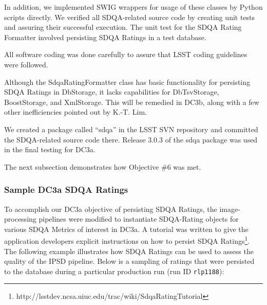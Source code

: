 \noindent
In addition, we implemented SWIG wrappers for usage of these classes by Python scripts
directly.  We verified all SDQA-related source code by creating unit tests and assuring
their successful execution.  The unit test for the SDQA Rating Formatter involved 
persisting SDQA Ratings in a test database.  

All software coding was done carefully to assure that LSST coding guidelines were followed.

Although the SdqaRatingFormatter class has basic functionality for persisting SDQA Ratings
in DbStorage, it lacks capabilities for DbTsvStorage, BoostStorage, and XmlStorage.  This
will be remedied in DC3b, along with a few other inefficiencies pointed out by K.-T. Lim.

We created a package called ``sdqa'' in the LSST SVN repository and committed the SDQA-related source code there.  Release 3.0.3 of the sdqa package was used in the 
final testing for DC3a.

The next subsection demonstrates how Objective \#6 was met.


\subsubsection{Sample DC3a SDQA Ratings}

To accomplish our DC3a objective of persisting SDQA Ratings, the
image-processing pipelines were modified to instantiate SDQA-Rating
objects for various SDQA Metrics of interest in DC3a.  A tutorial was
written to give the application developers explicit instructions on
how to persist SDQA
Ratings\footnote{http://lsstdev.ncsa.uiuc.edu/trac/wiki/SdqaRatingTutorial}.
The following example illustrates how SDQA Ratings can be used to
assess the quality of the IPSD pipeline.   Below is a sampling of
ratings that were persisted to the database during a particular
production run (run ID {\tt rlp1188}):

